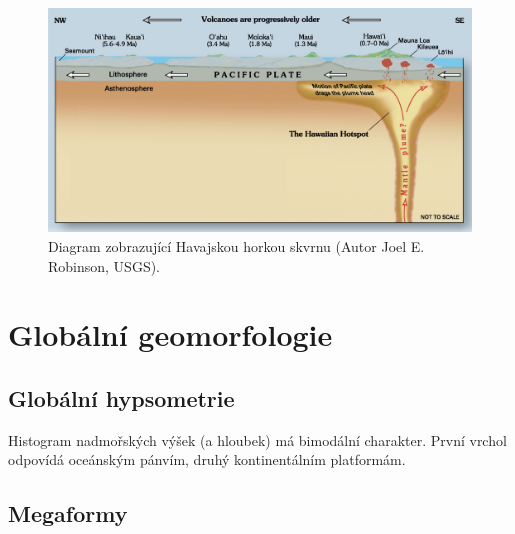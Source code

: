 \begin{figure}
	\centering
	\includegraphics{obrazky/tectonic/Hawaii_hotspot}
	\caption{Diagram zobrazující Havajskou horkou skvrnu (Autor Joel E. Robinson, USGS).}
	\label{fig:hawaiihotspot}
\end{figure}

\section{Globální geomorfologie}
\subsection{Globální hypsometrie}
Histogram nadmořských výšek (a hloubek) má bimodální charakter. První vrchol odpovídá oceánským pánvím, druhý kontinentálním platformám.

\subsection{Megaformy}
